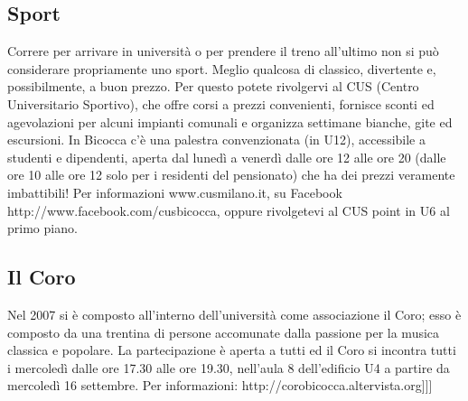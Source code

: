 \subsection{Sport}
Correre per arrivare in università o per prendere il treno all'ultimo non si può considerare propriamente uno sport. Meglio qualcosa di classico, divertente e, possibilmente, a buon prezzo.
Per questo potete rivolgervi al CUS (Centro Universitario Sportivo), che offre corsi a prezzi convenienti, fornisce sconti ed agevolazioni per alcuni impianti comunali e organizza settimane bianche, gite ed escursioni. In Bicocca c'è una palestra convenzionata (in U12), accessibile a studenti e dipendenti, aperta dal lunedì a venerdì dalle ore 12 alle ore 20 (dalle ore 10 alle ore 12 solo per i residenti del pensionato) che ha dei prezzi veramente imbattibili! Per informazioni www.cusmilano.it, su Facebook http://www.facebook.com/cusbicocca, oppure rivolgetevi al CUS point in U6 al primo piano.

\subsection{Il Coro}
Nel 2007 si è composto all'interno dell'università come associazione il Coro; esso è composto da una trentina di persone accomunate dalla passione per la musica classica e popolare. La partecipazione è aperta a tutti ed il Coro si incontra tutti i mercoledì dalle ore 17.30 alle ore 19.30, nell'aula 8 dell'edificio U4 a partire da mercoledì 16 settembre. Per informazioni: http://corobicocca.altervista.org]]]

